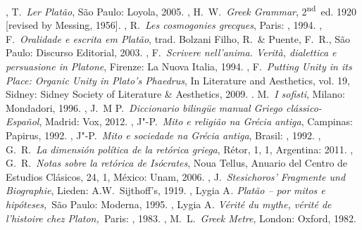 \begin{bibliohedra}
, T.~\emph{Ler Platão}, São Paulo: Loyola, 2005.
, H.~W.~\emph{Greek Grammar}, 2\textsuperscript{nd}~ed. 1920
  [revised by Messing, 1956].
, R.~\emph{Les cosmogonies grecques}, Paris: , 1994.
, F.~\emph{Oralidade e escrita em Platão}, trad. Bolzani
  Filho, R.~\& Puente, F.~R., São Paulo: Discurso Editorial, 2003.
, F.~\emph{Scrivere nell'anima. Verità, dialettica e
  persuasione in Platone}, Firenze: La Nuova Italia, 1994.
, F.~\emph{Putting Unity in its Place: Organic Unity in
  Plato's Phaedrus}, In Literature and Aesthetics, vol. 19, Sidney:
  Sidney Society of Literature \& Aesthetics, 2009.
. M.~\emph{I sofisti}, Milano: Mondadori, 1996.
, J.~M P.~\emph{Diccionario bilingüe manual Griego clássico-
  Español}, Madrid: Vox, 2012.
, J"-P.~\emph{Mito e religião na Grécia antiga}, Campinas:
  Papirus, 1992.
, J"-P.~\emph{Mito e sociedade na Grécia antiga}, Brasil: ,
  1992.
, G.~R.~\emph{La dimensión política de la retórica griega},
  Rétor, 1, 1, Argentina: 2011.
, G.~R.~\emph{Notas sobre la retórica de Isócrates}, Noua Tellus,
  Anuario del Centro de Estudios Clásicos, 24, 1, México: Unam, 2006.
, J.~\emph{Stesichoros' Fragmente und Biographie}, Lieden:
  A.W.~Sijthoff's, 1919.
, Lygia A\emph{. Platão -- por mitos e hipóteses,}~São Paulo:
  Moderna, 1995.
, Lygia A\emph{. Vérité du mythe, vérité de l'histoire chez
  Platon,~}Paris: , 1983.
, M.~L.~\emph{Greek Metre}, London: Oxford, 1982.
\end{bibliohedra}
